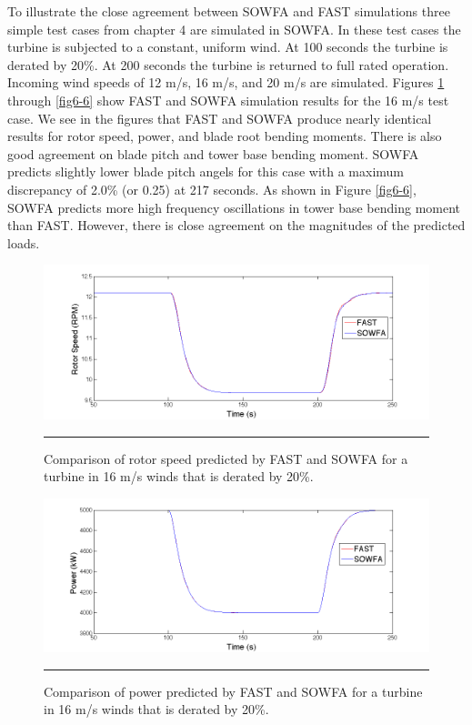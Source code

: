To illustrate the close agreement between SOWFA and FAST simulations three simple test cases from chapter 4 are simulated in SOWFA. In these test cases the turbine is subjected to a constant, uniform wind. At 100 seconds the turbine is derated by 20\%. At 200 seconds the turbine is returned to full rated operation. Incoming wind speeds of 12 m/s, 16 m/s, and 20 m/s are simulated. Figures \ref{fig6-2} through \ref{fig6-6} show FAST and SOWFA simulation results for the 16 m/s test case. We see in the figures that FAST and SOWFA produce nearly identical results for rotor speed, power, and blade root bending moments. There is also good agreement on blade pitch and tower base bending moment. SOWFA predicts slightly lower blade pitch angels for this case with a maximum discrepancy of 2.0\% (or 0.25\degree) at 217 seconds. As shown in Figure \ref{fig6-6}, SOWFA predicts more high frequency oscillations in tower base bending moment than FAST. However, there is close agreement on the magnitudes of the predicted loads. 

\begin{figure}[htbp]	\label{fig6-2}
	\centering
		\includegraphics[trim = {1cm 0 2cm 0}, clip, width = \linewidth]{Figures/ch6Figures/fig6-2.png}
		\rule{35em}{0.5pt}
	\caption{Comparison of rotor speed predicted by FAST and SOWFA for a turbine in 16 m/s winds that is derated by 20\%. }
\end{figure}

\begin{figure}[htbp]	\label{fig6-3}
	\centering
		\includegraphics[trim = {1cm 0 2cm 0}, clip, width = \linewidth]{Figures/ch6Figures/fig6-3.png}
		\rule{35em}{0.5pt}
	\caption{Comparison of power predicted by FAST and SOWFA for a turbine in 16 m/s winds that is derated by 20\%.}
\end{figure}

